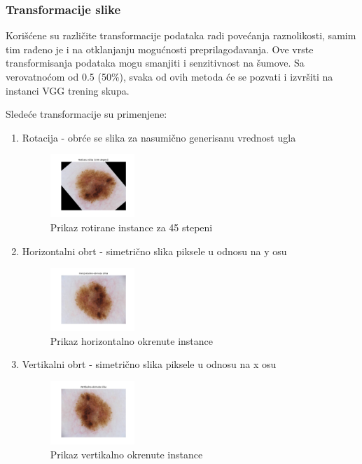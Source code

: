 \documentclass{article}
\begin{document}
\subsubsection{Transformacije slike}
Korišćene su različite transformacije podataka radi povećanja raznolikosti, samim tim rađeno je i na otklanjanju mogućnosti preprilagođavanja. Ove vrste transformisanja podataka mogu smanjiti i senzitivnost na šumove. Sa verovatnoćom od 0.5 (50\%), svaka od ovih metoda će se pozvati i izvršiti na instanci VGG trening skupa.
\par
Sledeće transformacije su primenjene:

\begin{enumerate}
    \item Rotacija - obrće se slika za nasumično generisanu vrednost ugla
    \begin{figure}[H]
        \centering
        \includegraphics[width=0.3\textwidth]{slike_raka/rotated_image.png} 
        \caption{Prikaz rotirane instance za 45 stepeni} 
        \label{rotacija}
    \end{figure}
    \item Horizontalni obrt - simetrično slika piksele u odnosu na y osu
    \begin{figure}[H]
        \centering
        \includegraphics[width=0.3\textwidth]{slike_raka/horizontal_flip_image.png} 
        \caption{Prikaz horizontalno okrenute instance} 
        \label{horizontalno okrenuta instanca}
    \end{figure}
    \item Vertikalni obrt - simetrično slika piksele u odnosu na x osu
    \begin{figure}[H]
        \centering
        \includegraphics[width=0.3\textwidth]{slike_raka/vertical_flip_image.png} 
        \caption{Prikaz vertikalno okrenute instance} 
        \label{vertikalno okrenuta instanca}
    \end{figure}
\end{enumerate}
\end{document}
